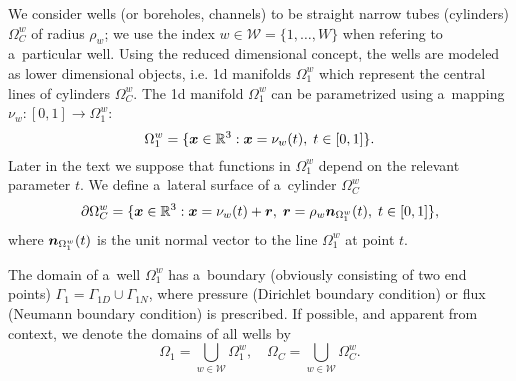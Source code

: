 We consider wells (or boreholes, channels) to be straight narrow tubes (cylinders) $\Omega^w_C$ of radius $\rho_w$;
we use the index $w\in\mathcal{W}=\{1,\ldots,W\}$ when refering to a~particular well.
Using the reduced dimensional concept, the wells are modeled as lower dimensional objects,
i.e. 1d manifolds $\Omega^w_1$ which represent the central lines of cylinders $\Omega^w_C$.
The 1d manifold $\Omega^w_1$ can be parametrized using a~mapping $\nu_w: [0,1] \rightarrow \Omega^w_1$:
\begin{equation} \label{eqn:1d_parametrization}
    \Omega^w_1 = \{\vc x\in\R^3: \vc x = \nu_w(t),\; t\in[0,1] \}. %
\end{equation}
Later in the text we suppose that functions in $\Omega^w_1$ depend on the relevant parameter $t$.
We define a~lateral surface of a~cylinder $\Omega^w_C$
\begin{equation}
    \partial\Omega^w_C = \{\mathbf{\boldsymbol{x}}\in\mathbb{R}^3: \mathbf{\boldsymbol{x}} = \nu_w(t) + \mathbf{\boldsymbol{r}},\; \mathbf{\boldsymbol{r}}=\rho_w\mathbf{\boldsymbol{n}}_{\Omega^w_1}(t),\; t\in[0,1] \},
\end{equation}
where $\mathbf{\boldsymbol{n}}_{\Omega^w_1}(t)$ is the unit normal vector to the line $\Omega^w_1$ at point $t$.

The domain of a~well $\Omega^w_1$ has a~boundary (obviously consisting of two end points)
$\Gamma_1 = \Gamma_{1D} \cup \Gamma_{1N}$, where pressure (Dirichlet boundary condition)
or flux (Neumann boundary condition) is prescribed.
If possible, and apparent from context, we denote the domains of all wells by
\begin{equation}
    \Omega_1 = \bigcup_{w\in\mathcal{W}} \Omega^w_1, \quad \Omega_C = \bigcup_{w\in\mathcal{W}} \Omega^w_C.
\end{equation}

